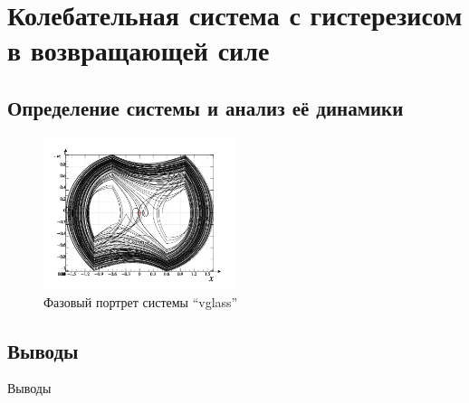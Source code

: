 
\FloatBarrier
\section{Колебательная система с гистерезисом в возвращающей силе} %
\label{atu:sect:vglass}


\subsection{Определение системы и анализ её динамики} %




\begin{figure}[htb!]
\centerline{\includegraphics[width=0.5\textwidth]{p/cha/vg1-graph_phase.png} }
\caption{Фазовый портрет системы ``vglass'' }
\label{atu:f:vglass_phase}
\end{figure}


\subsection{Выводы}  %

Выводы



